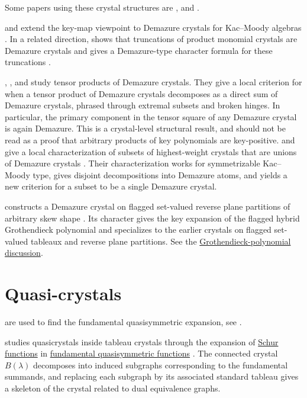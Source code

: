 Some papers using these crystal structures are
\cite{Wang2020x}, \cite{AssafSchilling2018} and \cite{AssafGonzalez2020x}.

 and  extend the key-map
viewpoint to Demazure crystals for Kac--Moody algebras
\cite{JaconLecouvey2020}.  In a related direction,  shows
that truncations of product monomial crystals are Demazure crystals and gives
a Demazure-type character formula for these truncations \cite{Gibson2021}.

, , and 
\cite{AssafDranowskiGonzalez2023} study tensor products of Demazure crystals.
They give a local criterion for when a tensor product of Demazure crystals
decomposes as a direct sum of Demazure crystals, phrased through extremal
subsets and broken hinges.  In particular, the primary component in the tensor
square of any Demazure crystal is again Demazure.  This is a crystal-level
structural result, and should not be read as a proof that arbitrary products of
key polynomials are key-positive.
 and  give a local
characterization of subsets of highest-weight crystals that are unions of
Demazure crystals \cite{AssafGonzalez2025x}.  Their characterization works for
symmetrizable Kac--Moody type, gives disjoint decompositions into Demazure
atoms, and yields a new criterion for a subset to be a single Demazure crystal.

 constructs a Demazure crystal on flagged set-valued
reverse plane partitions of arbitrary skew shape \cite[Thm.~4]{Kundu2026x}.
Its character gives the key expansion of the flagged hybrid Grothendieck
polynomial and specializes to the earlier crystals on flagged set-valued
tableaux and reverse plane partitions.  See the
\hyperref[grothendieckSkewStable]{Grothendieck-polynomial discussion}.



\section[quasiCrystals]{Quasi-crystals}


\label{quasiCrystal} are used to find the fundamental
quasisymmetric expansion, see
\cite{CainMalheiroRodriguesRodrigues2023Local,CainMalheiroRodriguesRodrigues2023Structure}.

 studies quasicrystals
inside tableau crystals through the expansion of \hyperref[schurFunction]{Schur
functions} in
\hyperref[gessel]{fundamental quasisymmetric functions}
\cite{MaasGariepy2023x}.  The connected crystal $B(\lambda)$ decomposes into
induced subgraphs corresponding to the fundamental summands, and replacing
each subgraph by its associated standard tableau gives a skeleton of the
crystal related to dual equivalence graphs.


